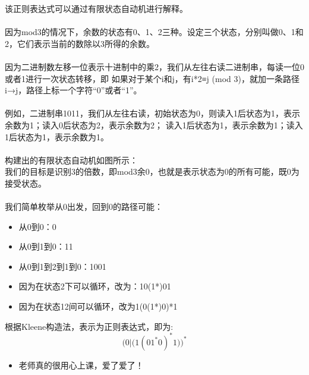 \documentclass[a4paper, justified]{tufte-handout}
\begin{document}
\begin{solution}
  该正则表达式可以通过有限状态自动机进行解释。\\\\
  因为mod3的情况下，余数的状态有0、1、2三种。设定三个状态，分别叫做0、1和2，它们表示当前的数除以3所得的余数。\\\\
  因为二进制数左移一位表示十进制中的乘2，我们从左往右读二进制串，每读一位0或者1进行一次状态转移，即
  如果对于某个i和j，有i*2≡j (mod 3)，就加一条路径i→j，路径上标一个字符“0”或者“1”。\\\\
  例如，二进制串1011，我们从左往右读，初始状态为0，则读入1后状态为1，表示余数为1；读入0后状态为2，表示余数为2；
  读入1后状态为1，表示余数为1；读入1后状态为1，表示余数为1。\\\\
  构建出的有限状态自动机如图所示：
  \\
  我们的目标是识别3的倍数，即mod3余0，也就是表示状态为0的所有可能，既0为接受状态。\\\\
  我们简单枚举从0出发，回到0的路径可能：
  \begin{itemize}
    \item 从0到0：0
    \item 从0到1到0：11
    \item 从0到1到2到1到0：1001
    \item 因为在状态2下可以循环，改为：10(1*)01
    \item 因为在状态12间可以循环，改为1(0(1*)0)*1
  \end{itemize}

  根据Kleene构造法，表示为正则表达式，即为:
  \[ 
    \Big(0|\big(1(01^{\ast}0)^{\ast}1\big)\Big)^{\ast} 
  \]

\end{solution}



\beginfb


\begin{itemize}
  \item 老师真的很用心上课，爱了爱了！
\end{itemize}
\end{document}
